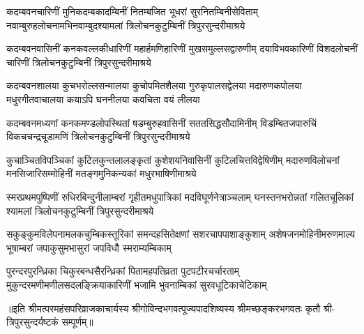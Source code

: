 
\fourlineindentedshloka
{कदम्बवनचारिणीं मुनिकदम्बकादम्बिनीं}
{नितम्बजित भूधरां सुरनितम्बिनीसेविताम्}
{नवाम्बुरुहलोचनामभिनवाम्बुदश्यामलां}
{त्रिलोचनकुटुम्बिनीं त्रिपुरसुन्दरीमाश्रये} %

\fourlineindentedshloka
{कदम्बवनवासिनीं कनकवल्लकीधारिणीं}
{महार्हमणिहारिणीं मुखसमुल्लसद्वारुणीम्}
{दयाविभवकारिणीं विशदलोचनीं चारिणीं}
{त्रिलोचनकुटुम्बिनीं त्रिपुरसुन्दरीमाश्रये} %

\fourlineindentedshloka
{कदम्बवनशालया कुचभरोल्लसन्मालया}
{कुचोपमितशैलया गुरुकृपालसद्वेलया}
{मदारुणकपोलया मधुरगीतवाचालया}
{कयाऽपि घननीलया कवचिता वयं लीलया} %

\fourlineindentedshloka
{कदम्बवनमध्यगां कनकमण्डलोपस्थितां}
{षडम्बुरुहवासिनीं सततसिद्धसौदामिनीम्}
{विडम्बितजपारुचिं विकचचन्द्रचूडामणिं}
{त्रिलोचनकुटुम्बिनीं त्रिपुरसुन्दरीमाश्रये} %

\fourlineindentedshloka
{कुचाञ्चितविपञ्चिकां कुटिलकुन्तलालङ्कृतां}
{कुशेशयनिवासिनीं कुटिलचित्तविद्वेषिणीम्}
{मदारुणविलोचनां मनसिजारिसम्मोहिनीं}
{मतङ्गमुनिकन्यकां मधुरभाषिणीमाश्रये} %

\fourlineindentedshloka
{स्मरप्रथमपुष्पिणीं रुधिरबिन्दुनीलाम्बरां}
{गृहीतमधुपात्रिकां मदविघूर्णनेत्राञ्चलाम्}
{घनस्तनभरोन्नतां गलितचूलिकां श्यामलां}
{त्रिलोचनकुटुम्बिनीं त्रिपुरसुन्दरीमाश्रये} %

\fourlineindentedshloka
{सकुङ्कुमविलेपनामलकचुम्बिकस्तूरिकां}
{समन्दहसितेक्षणां सशरचापपाशाङ्कुशाम्}
{अशेषजनमोहिनीमरुणमाल्य भूषाम्बरां}
{जपाकुसुमभासुरां जपविधौ स्मराम्यम्बिकाम्} %

\fourlineindentedshloka
{पुरन्दरपुरन्ध्रिका चिकुरबन्धसैरन्ध्रिकां}
{पितामहपतिव्रता पुटपटीरचर्चारताम्}
{मुकुन्दरमणीमणीलसदलङ्क्रियाकारिणीं}
{भजामि भुवनाम्बिकां सुरवधूटिकाचेटिकाम्} %

॥इति श्रीमत्परमहंसपरिव्राजकाचार्यस्य श्रीगोविन्दभगवत्पूज्यपादशिष्यस्य श्रीमच्छङ्करभगवतः कृतौ श्री-त्रिपुरसुन्दर्यष्टकं सम्पूर्णम्॥